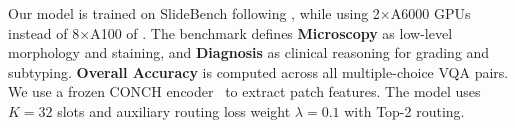 \documentclass[runningheads]{llncs}
\begin{document}
Our model is trained on SlideBench following \citep{Chen2025SlideChat}, while using 2$\times$A6000 GPUs instead of 8$\times$A100 of \citep{Chen2025SlideChat}.
The benchmark defines \textbf{Microscopy} as low-level morphology and staining, and \textbf{Diagnosis} as clinical reasoning for grading and subtyping. \textbf{Overall Accuracy} is computed across all multiple-choice VQA pairs. We use a frozen \textsc{CONCH} encoder~\citep{Lu2024VisualLanguage} to extract patch features. The model uses $K=32$ slots and auxiliary routing loss weight $\lambda = 0.1$ with Top-2 routing.
\end{document}

